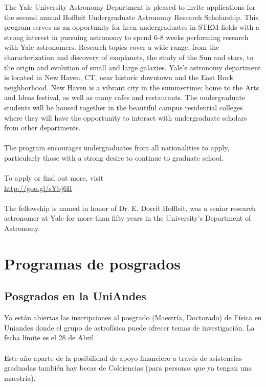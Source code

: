 \documentclass{book}
\begin{document}
The Yale University Astronomy Department is pleased to invite applications for the second annual Hoffleit Undergraduate Astronomy Research Scholarship. This program serves as an opportunity for keen undergraduates in STEM fields with a strong interest in pursuing astronomy to spend 6-8 weeks performing research with Yale astronomers. Research topics cover a wide range, from the characterization and discovery of exoplanets, the study of the Sun and stars, to the origin and evolution of small and large galaxies. Yale’s astronomy department is located in New Haven, CT, near historic downtown and the East Rock neighborhood. New Haven is a vibrant city in the summertime; home to the Arts and Ideas festival, as well as many cafes and restaurants. The undergraduate students will be housed together in the beautiful campus residential colleges where they will have the opportunity to interact with undergraduate scholars from other departments.\\
\\
The program encourages undergraduates from all nationalities to apply, particularly those with a strong desire to continue to graduate school.\\
\\
To apply or find out more, visit\\ \url{http://goo.gl/sYbj6H}\\
\\
The fellowship is named in honor of Dr. E. Dorrit Hoffleit, was a senior research astronomer at Yale for more than fifty years in the University’s Department of Astronomy.


\section*{Programas de posgrados}


\subsection{Posgrados en la UniAndes}

Ya están abiertas las inscripciones al posgrado (Maestría, Doctorado) de Física en Uniandes donde el grupo de astrofísica puede ofrecer temas de investigación. La fecha límite es el 28 de Abril.\\
\\
Este año aparte de la posibilidad de apoyo financiero a través de asistencias graduadas también hay becas de Colciencias (para personas que ya tengan una maestría).\\
\end{document}
